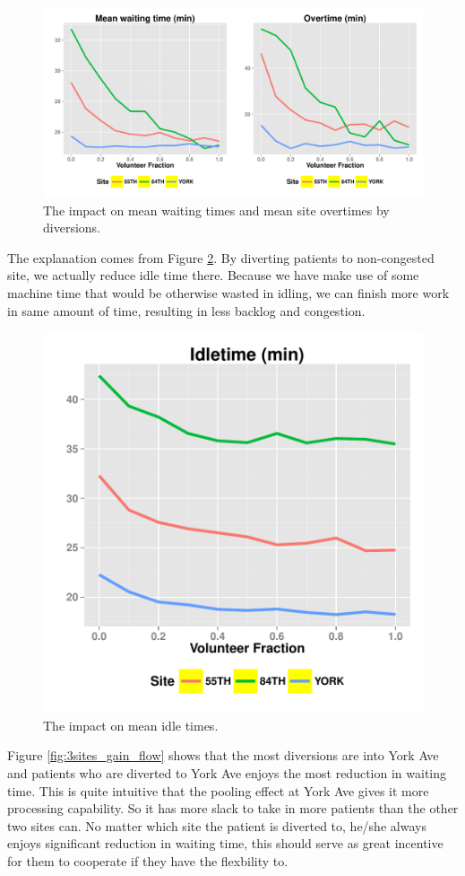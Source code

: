 \begin{figure}[htp]
\centering
\includegraphics[width=.95\textwidth]{chap3/numeric/pic/3sites_wait_over}
\caption{The impact on mean waiting times and mean site overtimes by diversions.}
\label{fig:3sites_wait_over}
\end{figure}

The explanation comes from Figure \ref{fig:3sites_idle}. By
diverting patients to non-congested site, we actually reduce
idle time there. Because we have make use of some machine time that
would be otherwise wasted in idling, we can finish more work
in same amount of time, resulting in less backlog and congestion.

\begin{figure}[htp]
\centering
\includegraphics[width=.6\textwidth]{chap3/numeric/pic/3sites_idle}
\caption{The impact on mean idle times.}
\label{fig:3sites_idle}
\end{figure}

Figure \ref{fig:3sites_gain_flow} shows that the most diversions are
into York Ave and patients who are diverted to York Ave enjoys the
most reduction in waiting time. This is quite intuitive that
the pooling effect at York Ave gives it more processing capability.
So it has more slack to take in more patients than the other two
sites can. No matter which site the patient is diverted to,
he/she always enjoys significant reduction in waiting time, this
should serve as great incentive for them to cooperate if they
have the flexbility to.

